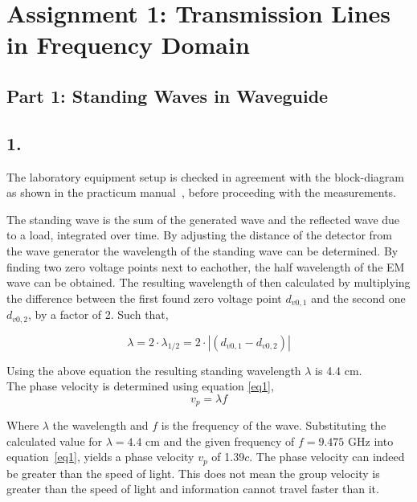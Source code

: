 \section*{Assignment 1: Transmission Lines in Frequency Domain}
	\subsection*{Part 1: Standing Waves in Waveguide}

	\subsection*{1.}
	The laboratory equipment setup is checked in agreement with the block-diagram as shown in the practicum manual~\cite{manual}, before proceeding with the measurements.

	The standing wave is the sum of the generated wave and the reflected wave due to a load, integrated over time. 
	By adjusting the distance of the detector from the wave generator the wavelength of the standing wave can be determined.
	By finding two zero voltage points next to eachother, the half wavelength of the EM wave can be obtained. 
	The resulting wavelength of then calculated by multiplying the difference between the first found zero voltage point $d_{v0,1}$ and the second one $d_{v0,2}$, by a factor of 2. Such that,

	\begin{equation}
		\lambda = 2\cdot\lambda_{1/2} = 2\cdot|(d_{v0,1} - d_{v0,2})|
	\end{equation}

	\noindent Using the above equation the resulting standing wavelength $\lambda$ is 4.4 cm.\\
	\newline	
	The phase velocity is determined using equation \ref{eq1}, 
	\begin{equation}
	\label{eq1}
	v_p = \lambda f
	\end{equation}

	\noindent Where $\lambda$ the wavelength and $f$ is the frequency of the wave. Substituting the calculated value for $\lambda = 4.4$ cm and the given frequency of $f = 9.475$ GHz into equation~\ref{eq1}, yields a phase velocity $v_p$ of 1.39$c$. The phase velocity can indeed be greater than the speed of light. This does not mean the group velocity is greater than the speed of light and information cannot travel faster than it.
	
